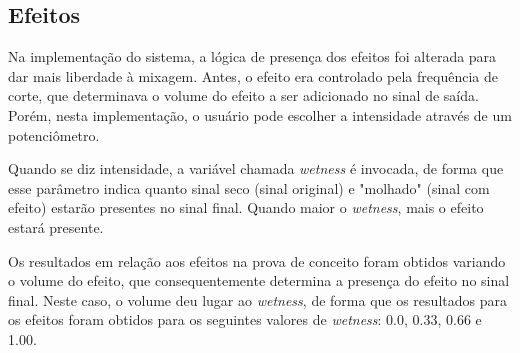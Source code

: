 





\subsection{Efeitos}

Na implementação do sistema, a lógica de presença dos efeitos foi alterada para dar mais liberdade à mixagem. Antes, o efeito era controlado pela frequência de corte, que determinava o volume do efeito a ser adicionado no sinal de saída. Porém, nesta implementação, o usuário pode escolher a intensidade através de um potenciômetro.

Quando se diz intensidade, a variável chamada \textit{wetness} é invocada, de forma que esse parâmetro indica quanto sinal seco (sinal original) e "molhado" (sinal com efeito) estarão presentes no sinal final. Quando maior o \textit{wetness}, mais o efeito estará presente. 

Os resultados em relação aos efeitos na prova de conceito foram obtidos variando o volume do efeito, que consequentemente determina a presença do efeito no sinal final. Neste caso, o volume deu lugar ao \textit{wetness}, de forma que os resultados para os efeitos foram obtidos para os seguintes valores de \textit{wetness}: 0.0, 0.33, 0.66 e 1.00. 

